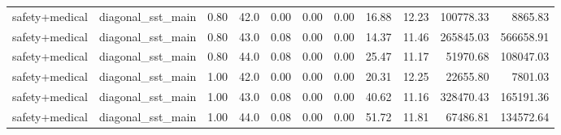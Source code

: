 \documentclass{article}
\begin{document}
\begin{table}[H]
{\begin{tabular}{llllrrrrrrr}
safety+medical & diagonal\_sst\_main & 0.80 & 42.0 & 0.00 & 0.00 & 0.00 & 16.88 & 12.23 & 100778.33 & 8865.83 \\
safety+medical & diagonal\_sst\_main & 0.80 & 43.0 & 0.08 & 0.00 & 0.00 & 14.37 & 11.46 & 265845.03 & 566658.91 \\
safety+medical & diagonal\_sst\_main & 0.80 & 44.0 & 0.08 & 0.00 & 0.00 & 25.47 & 11.17 & 51970.68 & 108047.03 \\
safety+medical & diagonal\_sst\_main & 1.00 & 42.0 & 0.00 & 0.00 & 0.00 & 20.31 & 12.25 & 22655.80 & 7801.03 \\
safety+medical & diagonal\_sst\_main & 1.00 & 43.0 & 0.08 & 0.00 & 0.00 & 40.62 & 11.16 & 328470.43 & 165191.36 \\
safety+medical & diagonal\_sst\_main & 1.00 & 44.0 & 0.08 & 0.00 & 0.00 & 51.72 & 11.81 & 67486.81 & 134572.64 \\
\bottomrule
\end{tabular}
}
\end{table}
\end{document}
